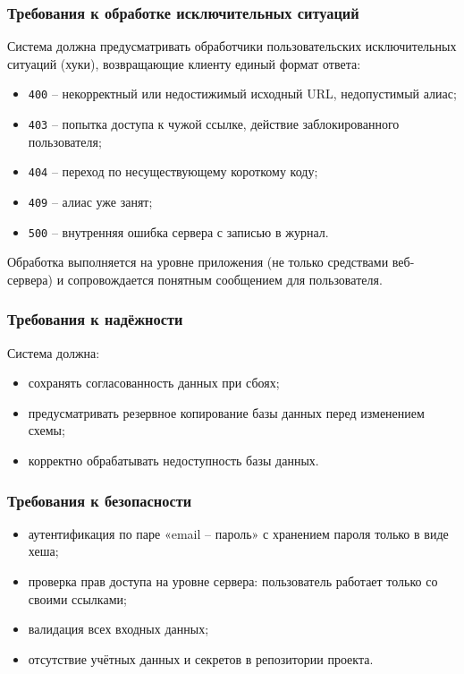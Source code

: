 \documentclass[14pt, a4paper]{extarticle}
\begin{document}
\subsubsection{Требования к обработке исключительных ситуаций}

Система должна предусматривать обработчики пользовательских исключительных ситуаций (хуки), возвращающие клиенту единый формат ответа:

\begin{itemize}
	\item \texttt{400} -- некорректный или недостижимый исходный URL, недопустимый алиас;
	\item \texttt{403} -- попытка доступа к чужой ссылке, действие заблокированного пользователя;
	\item \texttt{404} -- переход по несуществующему короткому коду;
	\item \texttt{409} -- алиас уже занят;
	\item \texttt{500} -- внутренняя ошибка сервера с записью в журнал.
\end{itemize}

Обработка выполняется на уровне приложения (не только средствами веб-сервера) и сопровождается понятным сообщением для пользователя.

\subsubsection{Требования к надёжности}

Система должна:

\begin{itemize}
	\item сохранять согласованность данных при сбоях;
	\item предусматривать резервное копирование базы данных перед изменением схемы;
	\item корректно обрабатывать недоступность базы данных.
\end{itemize}

\subsubsection{Требования к безопасности}

\begin{itemize}
	\item аутентификация по паре «email -- пароль» с хранением пароля только в виде хеша;
	\item проверка прав доступа на уровне сервера: пользователь работает только со своими ссылками;
	\item валидация всех входных данных;
	\item отсутствие учётных данных и секретов в репозитории проекта.
\end{itemize}
\end{document}
